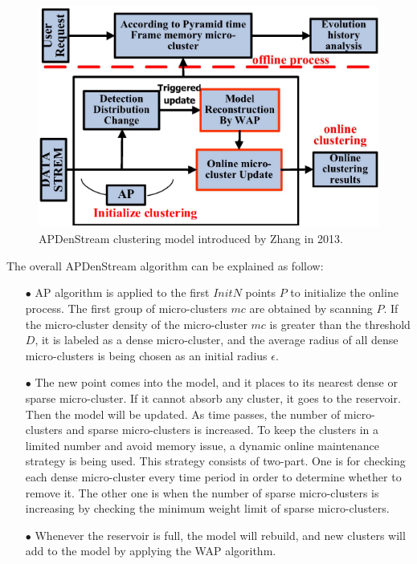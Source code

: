 \documentclass[../UNBThesis2.tex]{subfiles}
\begin{document}
\begin{itemize}[leftmargin=*]
\begin{figure}[h]
\centering
\includegraphics[width = 10 cm]{image/Chapters/Chapter3/APDenstream.PNG}
\caption{APDenStream clustering model introduced by Zhang in 2013. }
\label{APden}
\end{figure}


The overall APDenStream algorithm can be explained as follow:

\begin{itemize}
    \item[$\bullet$] AP algorithm is applied to the first $InitN$ points $P$ to initialize the online process. The first group of micro-clusters $mc$ are obtained by scanning $P$. If the micro-cluster density of the micro-cluster $mc$ is greater than the threshold $D$, it is labeled as a dense micro-cluster, and the average radius of all dense micro-clusters is being chosen as an initial radius $\epsilon$.
    
    \item[$\bullet$] The new point comes into the model, and it places to its nearest dense or sparse micro-cluster. If it cannot absorb any cluster, it goes to the reservoir. Then the model will be updated. As time passes, the number of micro-clusters and sparse micro-clusters is increased. To keep the clusters in a limited number and avoid memory issue, a dynamic online maintenance strategy is being used.  This strategy consists of two-part. One is for checking each dense micro-cluster every time period in order to determine whether to remove it. The other one is when the number of sparse micro-clusters is increasing by checking the minimum weight limit of sparse micro-clusters. 

    \item[$\bullet$] Whenever the reservoir is full, the model will rebuild, and new clusters will add to the model by applying the WAP algorithm.     
    

\end{itemize}
\end{itemize}
\end{document}
